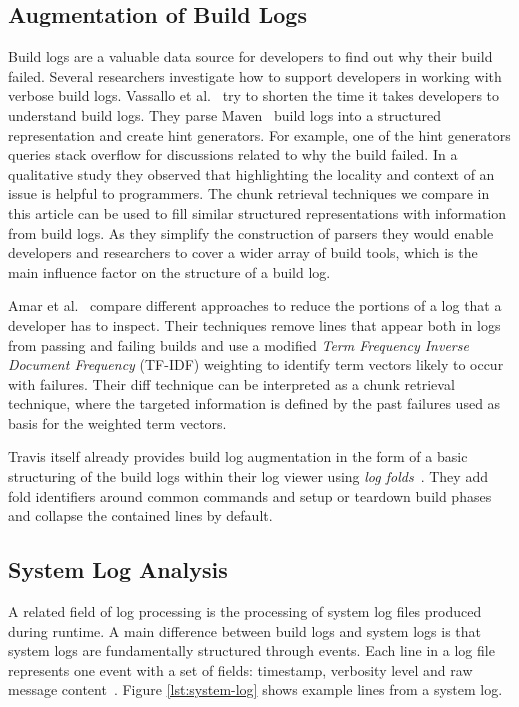 \subsection{Augmentation of Build Logs}
\label{sec:rw-bl-analysis}
Build logs are a valuable data source for developers to find out why their build failed.
Several researchers investigate how to support developers in working with verbose build logs.
Vassallo et al.~\cite{vassallo2018un-break} try to shorten the time it takes developers to understand build logs.
They parse Maven~\cite{maven2019website} build logs into a structured representation and create hint generators.
For example, one of the hint generators queries stack overflow for discussions related to why the build failed.
In a qualitative study they observed that highlighting the locality and context of an issue is helpful to programmers.
The chunk retrieval techniques we compare in this article can be used to fill similar structured representations with information from build logs.
As they simplify the construction of parsers they would enable developers and researchers to cover a wider array of build tools, which is the main influence factor on the structure of a build log.

Amar et al.~\cite{amar2019mining} compare different approaches to reduce the portions of a log that a developer has to inspect.
Their techniques remove lines that appear both in logs from passing and failing builds and use a modified \emph{Term Frequency Inverse Document Frequency} (TF-IDF) weighting to identify term vectors likely to occur with failures.
Their diff technique can be interpreted as a chunk retrieval technique, where the targeted information is defined by the past failures used as basis for the weighted term vectors.

Travis itself already provides build log augmentation in the form of a basic structuring of the build logs within their log viewer using \emph{log folds}~\cite{travis2019logfolds}.
They add fold identifiers around common commands and setup or teardown build phases and collapse the contained lines by default.

\subsection{System Log Analysis}
\label{sec:log-analysis}
A related field of log processing is the processing of system log files produced during runtime.
A main difference between build logs and system logs is that system logs are fundamentally structured through events.
Each line in a log file represents one event with a set of fields: timestamp, verbosity level and raw message content~\cite{he2017towards}.
Figure \ref{lst:system-log} shows example lines from a system log.

